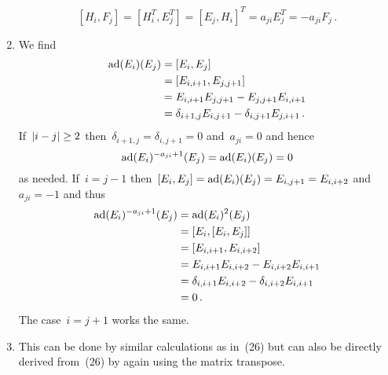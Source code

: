 \begin{enumerate}[label=(\arabic*),start=22]
    \[
      [H_i, F_j]
      =
      [H_i^T, E_j^T]
      =
      [E_j, H_i]^T
      =
      a_{ji} E_j^T
      =
      -a_{ji} F_j \,.
    \]
  \item
    We find
    \begin{align*}
      \operatorname{ad}(E_i)(E_j)
      &=
      [E_i, E_j]
      \\
      &=
      [E_{i,i+1}, E_{j,j+1}]
      \\
      &=
      E_{i,i+1} E_{j,j+1} - E_{j,j+1} E_{i,i+1}
      \\
      &=
      \delta_{i+1,j} E_{i,j+1} - \delta_{i,j+1} E_{j,i+1} \,.
    \end{align*}
    If~$\lvert i-j\rvert \geq 2$ then~$\delta_{i+1,j} = \delta_{i,j+1} = 0$ and~$a_{ji} = 0$ and hence
    \[
      \operatorname{ad}(E_i)^{-a_{ji}+1}(E_j)
      =
      \operatorname{ad}(E_i)(E_j)
      =
      0
    \]
    as needed.
    If~$i = j-1$ then~$[E_i, E_j] = \operatorname{ad}(E_i)(E_j) = E_{i,j+1} = E_{i,i+2}$ and~$a_{ji} = -1$ and thus
    \begin{align*}
      \operatorname{ad}(E_i)^{-a_{ji}+1}(E_j)
      &=
      \operatorname{ad}(E_i)^2(E_j)
      \\
      &=
      [E_i, [E_i, E_j]]
      \\
      &=
      [E_{i,i+1}, E_{i,i+2}]
      \\
      &=
      E_{i, i+1} E_{i, i+2} - E_{i,i+2} E_{i,i+1}
      \\
      &=
      \delta_{i,i+1} E_{i,i+2} - \delta_{i,i+2} E_{i,i+1}
      \\
      &=
      0 \,.
    \end{align*}
    The case~$i = j+1$ works the same.
  \item
    This can be done by similar calculations as in~(26) but can also be directly derived from~(26) by again using the matrix transpose.
\end{enumerate}


